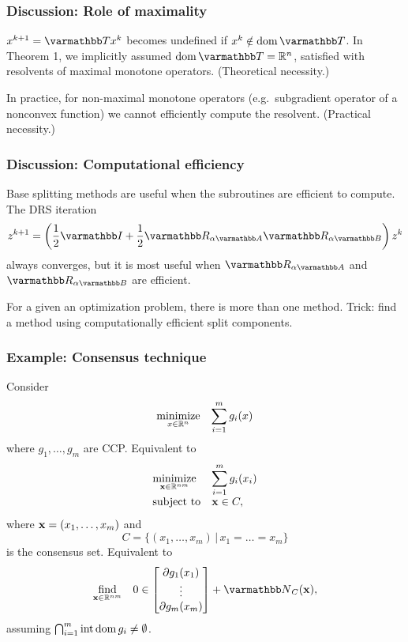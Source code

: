 \documentclass[10pt,mathserif]{beamer}
\begin{document}
\begin{frame}
\frametitle{Discussion: Role of maximality}
$x^{k+1}=\opT x^k$ becomes undefined if $x^k\notin \dom \opT$.
In Theorem 1, we implicitly assumed $\dom\opT=\reals^n$,
satisfied with resolvents of maximal monotone operators.
(Theoretical necessity.)
\vspace{0.2in}

In practice, for non-maximal monotone operators (e.g.\ subgradient operator of a nonconvex function) we cannot efficiently compute the resolvent.
(Practical necessity.)
\end{frame}


\begin{frame}
\frametitle{Discussion: Computational efficiency}
Base splitting methods are useful when the subroutines are efficient to compute.
The DRS iteration
\[
z^{k+1}=\left(\frac{1}{2}\opI+\frac{1}{2}\opR_{\alpha \opA}\opR_{\alpha \opB}\right)z^k
\]
always converges, but it is most useful when  $\opR_{\alpha \opA}$ and $\opR_{\alpha \opB}$ are efficient.
\vspace{0.2in}


For a given an optimization problem, there is more than one method.
Trick: find a method using computationally efficient split components.
\end{frame}




\begin{frame}
\frametitle{Example: Consensus technique}
Consider
\[
\begin{array}{ll}
\underset{x\in \mathbb{R}^n}{\mbox{minimize}} &
\displaystyle{\sum_{i=1}^m g_i(x)}
\end{array}
\]
where $g_1,\dots ,g_m$ are CCP.
Equivalent to
\[
\begin{array}{ll}
\underset{{\mathbf{x}}\in\mathbb{R}^{nm}}{\mbox{minimize}} & \displaystyle{\sum_{i=1}^m g_i(x_i)}\\
\mbox{subject to} & {\mathbf{x}}\in C,
\end{array}
\]
where ${\mathbf{x}} =(x_1,\dots,x_m)$ and
\[
C=\{(x_1,\dots,x_m)\,|\,x_1=\dots=x_m\}
\]
is the consensus set.
Equivalent to
\[
\begin{array}{ll}
\underset{\vx\in \reals^{nm}}{\mbox{find}}
&
\displaystyle{
0\in
\begin{bmatrix}
\partial g_1(x_1)\\
\vdots\\
\partial g_m(x_m)
\end{bmatrix}
+
\opN_{C}(\vx),}
\end{array}
\]
assuming $\bigcap^m_{i=1}\mathrm{int}\,\mathrm{dom}\, g_i\ne \emptyset$.
\end{frame}
\end{document}
